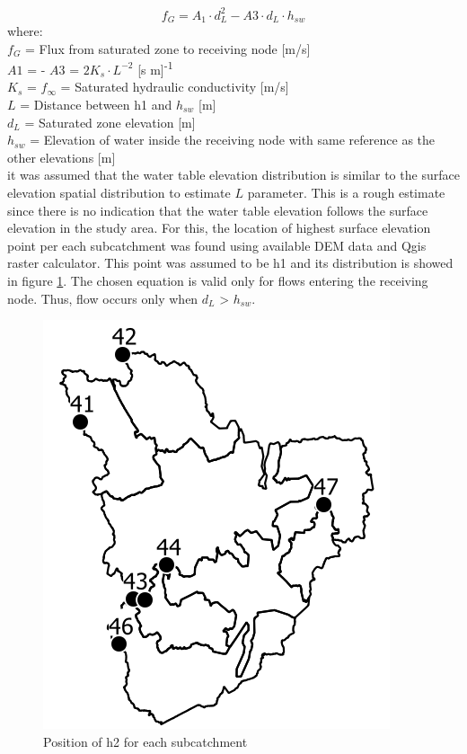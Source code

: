 \begin{equation}
\label{eqn:dfeq}
f_G = A_1 \cdot d^2_L - A3 \cdot d_L\cdot h_{sw}
\end{equation}
where: \\
\indent $f_G$ = Flux from saturated zone to receiving node [m/s] \\
\indent $A1$ = - $A3$ = $2K_s \cdot L^{-2}$ [s m]\textsuperscript{-1}\\
\indent $K_s$ = $f_\infty$ = Saturated hydraulic conductivity [m/s]\\
\indent $L$ = Distance between h1 and $h_{sw}$ [m]\\
\indent $d_L$ = Saturated zone elevation [m]\\
\indent $h_{sw}$ =  Elevation of water inside the receiving node with same reference as the other elevations [m]\\


it was assumed that the water table elevation distribution is similar to the surface elevation spatial distribution to estimate $L$ parameter. This is a rough estimate since there is no indication that the water table elevation follows the surface elevation in the study area. For this, the location of highest surface elevation point per each subcatchment was found using available DEM data and Qgis raster calculator. This point was assumed to be h1 and its distribution is showed in figure \ref{fig:h1position}. The chosen equation is valid only for flows entering the receiving node. Thus, flow occurs only when $d_L$ > $h_{sw}$.

\begin{figure}[h]
    \centering
	\includegraphics[scale=0.6]{figures/h2position.png}
	\caption{Position of h2 for each subcatchment}
	\label{fig:h1position}
\end{figure}


